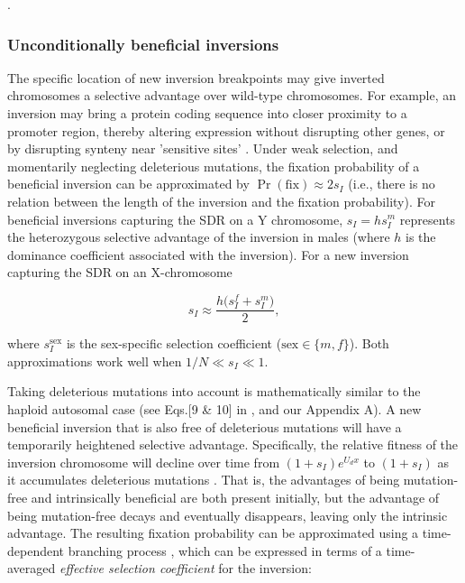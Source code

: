 \documentclass{article}
\begin{document}
.


\subsubsection*{Unconditionally beneficial inversions}

The specific location of new inversion breakpoints may give inverted chromosomes a selective advantage over wild-type chromosomes. For example, an inversion may bring a protein coding sequence into closer proximity to a promoter region, thereby altering expression without disrupting other genes, or by disrupting synteny near 'sensitive sites' \citep{KrimbasPowell1992, CorbettDetig2016}. Under weak selection, and momentarily neglecting deleterious mutations, the fixation probability of a beneficial inversion can be approximated by $\Pr(\text{fix}) \approx 2 s_{I}$ \citep{Haldane1927} (i.e., there is no relation between the length of the inversion and the fixation probability). For beneficial inversions capturing the SDR on a Y chromosome, $s_I = h s_{I}^{m}$ represents the heterozygous selective advantage of the inversion in males (where $h$ is the dominance coefficient associated with the inversion). For a new inversion capturing the SDR on an X-chromosome

\begin{equation} \label{eq:benXlinkednoDel}
	s_{I} \approx \frac{h \big( s_{I}^{f} + s_{I}^{m} \big)}{2},
\end{equation}

\noindent where $s_{I}^{\text{sex}}$ is the sex-specific selection coefficient ($\text{sex} \in \{m,f\}$). Both approximations work well when $1/N \ll s_I \ll 1$.

Taking deleterious mutations into account is mathematically similar to the haploid autosomal case (see Eqs.[9 \& 10] in \citealt{ConnallonOlito2020}, and our Appendix A). A new beneficial inversion that is also free of deleterious mutations will have a temporarily heightened selective advantage. Specifically, the relative fitness of the inversion chromosome will decline over time from $(1 + s_I)e^{U_d x}$ to $(1 + s_I)$ as it accumulates deleterious mutations \citep{Nei1967}. That is, the advantages of being mutation-free and intrinsically beneficial are both present initially, but the advantage of being mutation-free decays and eventually disappears, leaving only the intrinsic advantage. The resulting fixation probability can be approximated using a time-dependent branching process \citep{PeischlKirkpatrick2012, KirkpatrickPeischl2013}, which can be expressed in terms of a time-averaged {\itshape effective selection coefficient} for the inversion:
\end{document}
